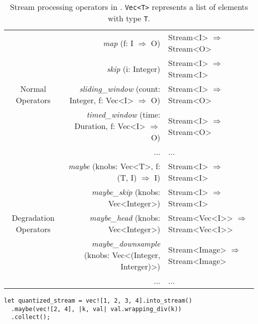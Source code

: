 \begin{table*}
  \small
  \centering
  \begin{tabular}{ c r l }
    \toprule
    \multirow{5}{*}{Normal Operators}
    & \textit{map} (f: I $\Rightarrow$ O) & Stream<I> $\Rightarrow$ Stream<O> \\
    & \textit{skip} (i: Integer) & Stream<I> $\Rightarrow$
                                   Stream<I> \\
    & \textit{sliding\_window} (count: Integer, f: Vec<I> $\Rightarrow$ O) & Stream<I> $\Rightarrow$
                                                                            Stream<O> \\
    & \textit{timed\_window} (time: Duration, f: Vec<I> $\Rightarrow$ O) & Stream<I> $\Rightarrow$
                                                                          Stream<O> \\
    & ... & ... \\
    \midrule
    \multirow{5}{*}{Degradation Operators}
    & \textit{maybe} (knobs: Vec<T>, f:  (T, I) $\Rightarrow$ I) & Stream<I> $\Rightarrow$
                                                                 Stream<I> \\
    & \textit{maybe\_skip} (knobs: Vec<Integer>) & Stream<I> $\Rightarrow$ Stream<I> \\
    & \textit{maybe\_head} (knobs: Vec<Integer>) & Stream<Vec<I>{}> $\Rightarrow$
                                                   Stream<Vec<I>{}> \\
    & \textit{maybe\_downsample} (knobs: Vec<(Integer, Interger)>) & Stream<Image> $\Rightarrow$ Stream<Image> \\
    & ... & ... \\
    \bottomrule
  \end{tabular}
  \caption{Stream processing operators in \sysname{}. \texttt{Vec<T>} represents
    a list of elements with type \texttt{T}.}
  \label{tab:operators}
\end{table*}

\vspace{-2pt}
\begin{lstlisting}
let quantized_stream = vec![1, 2, 3, 4].into_stream()
  .maybe(vec![2, 4], |k, val| val.wrapping_div(k))
  .collect();
\end{lstlisting}

